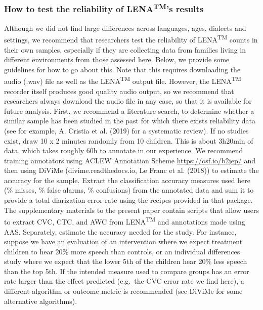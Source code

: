 \documentclass[english,floatsintext,man]{apa6}
\begin{document}
\subsubsection{\texorpdfstring{How to test the reliability of
LENA\textsuperscript{TM}'s
results}{How to test the reliability of LENATM's results}}\label{how-to-test-the-reliability-of-lenatms-results}

Although we did not find large differences across languages, ages,
dialects and settings, we recommend that researchers test the
reliability of LENA\textsuperscript{TM} counts in their own samples,
especially if they are collecting data from families living in different
environments from those assessed here. Below, we provide some guidelines
for how to go about this. Note that this requires downloading the audio
(.wav) file as well as the LENA\textsuperscript{TM} output file.
However, the LENA\textsuperscript{TM} recorder itself produces good
quality audio output, so we recommend that researchers always download
the audio file in any case, so that it is available for future analysis.
First, we recommend a literature search, to determine whether a similar
sample has been studied in the past for which there exists reliability
data (see for example, A. Cristia et al. (2019) for a systematic
review). If no studies exist, draw 10 x 2 minutes randomly from 10
children. This is about 3h20min of data, which takes roughly 60h to
annotate in our experience. We recommend training annotators using ACLEW
Annotation Scheme \url{https://osf.io/b2jep/} and then using DiViMe
(divime.readthedocs.io, Le Franc et al. (2018)) to estimate the accuracy
for the sample. Extract the classification accuracy measures used here
(\% misses, \% false alarms, \% confusions) from the annotated data and
sum it to provide a total diarization error rate using the recipes
provided in that package. The supplementary materials to the present
paper contain scripts that allow users to extract CVC, CTC, and AWC from
LENA\textsuperscript{TM} and annotations made using AAS. Separately,
estimate the accuracy needed for the study. For instance, suppose we
have an evaluation of an intervention where we expect treatment children
to hear 20\% more speech than controls, or an individual differences
study where we expect that the lower 5th of the children hear 20\% less
speech than the top 5th. If the intended measure used to compare groups
has an error rate larger than the effect predicted (e.g.~the CVC error
rate we find here), a different algorithm or outcome metric is
recommended (see DiViMe for some alternative algorithms).
\end{document}

